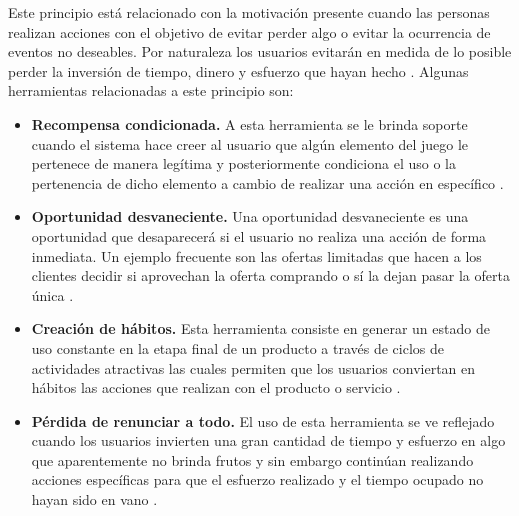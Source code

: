  Este principio está relacionado con la motivación presente cuando las personas realizan acciones
 con el objetivo de evitar perder algo o evitar la ocurrencia de eventos no deseables. Por naturaleza
 los usuarios evitarán en medida de lo posible perder la inversión de tiempo, dinero y esfuerzo que
 hayan hecho \cite[p. 311]{Octalysis}. Algunas herramientas relacionadas a este principio son:

    \begin{itemize}
    \item
    {\bf Recompensa condicionada.}
        A esta herramienta se le brinda soporte cuando el sistema hace creer al
        usuario que algún elemento del juego le pertenece de manera legítima y
        posteriormente condiciona el uso o la pertenencia de dicho elemento a
        cambio de realizar una acción en específico \cite[p. 330]{Octalysis}.

    \item
    {\bf Oportunidad desvaneciente.}
        Una oportunidad desvaneciente es una oportunidad que desaparecerá si el usuario no
        realiza una acción de forma inmediata. Un ejemplo frecuente son las ofertas limitadas
        que hacen a los clientes decidir si aprovechan la oferta comprando o sí la dejan
        pasar la oferta única \cite[p. 333]{Octalysis}.

    \item
    {\bf Creación de hábitos.}
        Esta herramienta consiste en generar un estado de uso constante en la etapa final
        de un producto a través de ciclos de actividades atractivas las cuales permiten que
        los usuarios conviertan en hábitos las acciones que realizan con el producto o servicio
        \cite[p. 334]{Octalysis}.

    \item
    {\bf Pérdida de renunciar a todo.}
        El uso de esta herramienta se ve reflejado cuando los usuarios invierten una gran
        cantidad de tiempo y esfuerzo en algo que aparentemente no brinda frutos y sin
        embargo continúan realizando acciones específicas para que el esfuerzo realizado y el
        tiempo ocupado no hayan sido en vano \cite[p. 338]{Octalysis}.

    \end{itemize}

\clearpage
